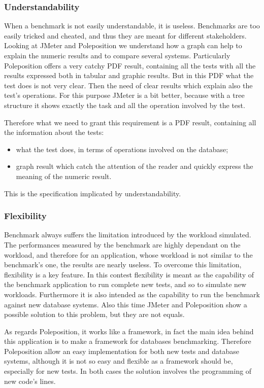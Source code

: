 			\subsubsection{Understandability}
When a benchmark is not easily understandable, it is useless. Benchmarks are too easily tricked and cheated, and thus they are meant for different stakeholders. Looking at JMeter and Poleposition we understand how a graph can help to explain the numeric results and to compare several systems. Particularly Poleposition offers a very catchy PDF result, containing all the tests with all the results expressed both in tabular and graphic results. But in this PDF what the test does is not very clear. Then the need of clear results which explain also the test's operations. For this purpose JMeter is a bit better, because with a tree structure it shows exactly the task and all the operation involved by the test.

Therefore what we need to grant this requirement is a PDF result, containing all the information about the tests: 
\begin{itemize}
	\item what the test does, in terms of operations involved on the database;
	\item graph result which catch the attention of the reader and quickly express the meaning of the numeric result.
\end{itemize}
This is the specification implicated by understandability.
			 
			\subsubsection{Flexibility}
Benchmark always suffers the limitation introduced by the workload simulated. The performances measured by the benchmark are highly dependant on the workload, and therefore for an application, whose workload is not similar to the benchmark's one, the results are nearly useless. To overcome this limitation, flexibility is a key feature. In this contest flexibility is meant as the capability of the benchmark application to run complete new tests, and so to simulate new workloads. Furthermore it is also intended as the capability to run the benchmark against new database systems. Also this time JMeter and Poleposition show a possible solution to this problem, but they are not equals.

As regards Poleposition, it works like a framework, in fact the main idea behind this application is to make a framework for databases benchmarking. Therefore Poleposition allow an easy implementation for both new tests and database systems, although it is not so easy and flexible as a framework should be, especially for new tests. In both cases the solution involves the programming of new code's lines.

